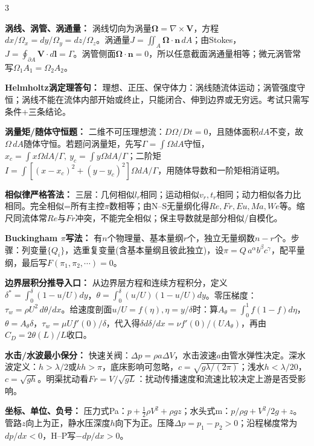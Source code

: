 \documentclass[a4paper]{article}
\newcommand{\sect}[1]{\par{\bfseries\color{Q}#1：}}
\begin{document}
\begin{multicols}{3}
{\sect{涡线、涡管、涡通量}
涡线切向为涡量$\bm\Omega=\nabla\times\bm V$，方程$dx/\Omega_x=dy/\Omega_y=dz/\Omega_z$。涡通量$J=\iint_A\bm\Omega\cdot\bm n\,dA$；由Stokes，$J=\oint_{\partial A}\bm V\cdot d\bm l=\Gamma$。涡管侧面$\bm\Omega\cdot\bm n=0$，所以任意截面涡通量相等；微元涡管常写$\Omega_1A_1=\Omega_2A_2$。
\sect{Helmholtz涡定理答句}
理想、正压、保守体力：涡线随流体运动；涡管强度守恒；涡线不能在流体内部开始或终止，只能闭合、伸到边界或无穷远。考试只需写条件+三条结论。
\sect{涡量矩/随体守恒题}
二维不可压理想流：$D\Omega/Dt=0$，且随体面积$dA$不变，故$\Omega\,dA$随体守恒。若题问涡量矩，先写$\Gamma=\int\Omega dA$守恒，$x_c=\int x\Omega dA/\Gamma,\ y_c=\int y\Omega dA/\Gamma$；二阶矩$I=\int[(x-x_c)^2+(y-y_c)^2]\Omega dA/\Gamma$，用随体导数和一阶矩相消证明。
\sect{相似律严格答法}
三层：几何相似$l_r$相同；运动相似$v_r,t_r$相同；动力相似各力比相同。完全相似=所有主控$\pi$数相等；由N--S无量纲化得$Re,Fr,Eu,Ma,We$等。缩尺同流体常$Re$与$Fr$冲突，不能完全相似；保主导数就是部分相似/自模化。
\sect{Buckingham $\pi$写法}
有$n$个物理量、基本量纲$r$个，独立无量纲数$n-r$个。步骤：列变量$\{Q_i\}$，选重复变量(含基本量纲且彼此独立)，设$\pi=Q\,a^\alpha b^\beta c^\gamma$，配平量纲，最后写$F(\pi_1,\pi_2,\cdots)=0$。
\sect{边界层积分推导入口}
从边界层方程和连续方程积分，定义$\delta^*=\int_0^\delta(1-u/U)dy$，$\theta=\int_0^\delta(u/U)(1-u/U)dy$。零压梯度：$\tau_w=\rho U^2\,d\theta/dx$。给速度剖面$u/U=f(\eta),\eta=y/\delta$时：算$A_\theta=\int_0^1f(1-f)d\eta$，$\theta=A_\theta\delta$，$\tau_w=\mu U f'(0)/\delta$，代入得$\delta d\delta/dx=\nu f'(0)/(UA_\theta)$，再由$C_D=2\theta(L)/L$收口。
\sect{水击/水波最小保分}
快速关阀：$\Delta p=\rho a\Delta V$，水击波速$a$由管水弹性决定。深水波定义：$h>\lambda/2$或$kh>\pi$，底床影响可忽略，$c=\sqrt{g\lambda/(2\pi)}$；浅水$h<\lambda/20$，$c=\sqrt{gh}$。明渠扰动看$Fr=V/\sqrt{gL}$：扰动传播速度和流速比较决定上游是否受影响。
\sect{坐标、单位、负号}
压力式Pa：$p+\frac12\rho V^2+\rho gz$；水头式m：$p/\rho g+V^2/2g+z$。管路$z$向上为正，静水压深度$h$向下为正。压降$\Delta p=p_1-p_2>0$；沿程梯度常为$dp/dx<0$，H--P写$-dp/dx>0$。

}
\end{multicols}
\end{document}
